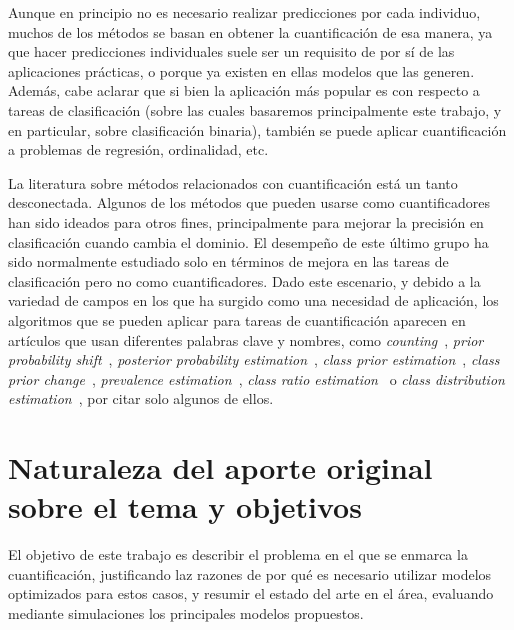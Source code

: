 \documentclass[a4paper, twoside, 11pt, spanish]{article}
\begin{document}
Aunque en principio no es necesario realizar predicciones por cada individuo,
muchos de los métodos se basan en obtener la cuantificación de esa manera, ya
que hacer predicciones individuales suele ser un requisito de por sí de las
aplicaciones prácticas, o porque ya existen en ellas modelos que las generen.
Además, cabe aclarar que si bien la aplicación más popular es con respecto a
tareas de clasificación (sobre las cuales basaremos principalmente este trabajo,
y en particular, sobre clasificación binaria), también se puede aplicar
cuantificación a problemas de regresión, ordinalidad, etc.

La literatura sobre métodos relacionados con cuantificación está un tanto
desconectada. Algunos de los métodos que pueden usarse como cuantificadores han
sido ideados para otros fines, principalmente para mejorar la precisión en
clasificación cuando cambia el dominio. El desempeño de este último grupo ha
sido normalmente estudiado solo en términos de mejora en las tareas de
clasificación pero no como cuantificadores. Dado este escenario, y debido a la
variedad de campos en los que ha surgido como una necesidad de aplicación, los
algoritmos que se pueden aplicar para tareas de cuantificación aparecen en
artículos que usan diferentes palabras clave y nombres, como {\it
counting\/}~\cite{lewis1995evaluating}, {\it prior probability
shift\/}~\cite{moreno2012unifying, storkey2009training}, {\it posterior
probability estimation\/}~\cite{alaiz2011class}, {\it class prior
estimation\/}~\cite{du2014class, chan2006estimating, zhang2010transfer}, {\it
class prior change\/}~\cite{du2014semi}, {\it prevalence
estimation\/}~\cite{barranquero2013study}, {\it class ratio
estimation\/}~\cite{asoh2012fast} o {\it class distribution
estimation\/}~\cite{gonzalez2013class, limsetto2011handling,
xue2009quantification}, por citar solo algunos de ellos.

\section*{Naturaleza del aporte original sobre el tema y objetivos}

El objetivo de este trabajo es describir el problema en el que se enmarca la
cuantificación, justificando laz razones de por qué es necesario utilizar
modelos optimizados para estos casos, y resumir el estado del arte en el área,
evaluando mediante simulaciones los principales modelos propuestos.

\bigskip


\end{document}
